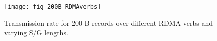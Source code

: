 \begin{figure}[H]
\texttt{[image: fig-200B-RDMAverbs]}
\caption{Transmission rate for 200 B records over different RDMA verbs and 
varying S/G lengths.}
\label{fig:200B_transrate}
\end{figure}
